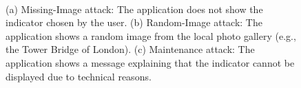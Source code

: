 \begin{figure}[!ht]
  \centering
  ~
  ~
  \caption[Different attacks presented to the three experimental groups]{
  (a) Missing-Image attack: The application does not show the indicator chosen by the user.
  (b) Random-Image attack: The application shows a random image from the local photo gallery (e.g., the Tower Bridge of London).
  (c) Maintenance attack: The application shows a message explaining that the indicator cannot be displayed due to technical reasons.
  }
\end{figure}

